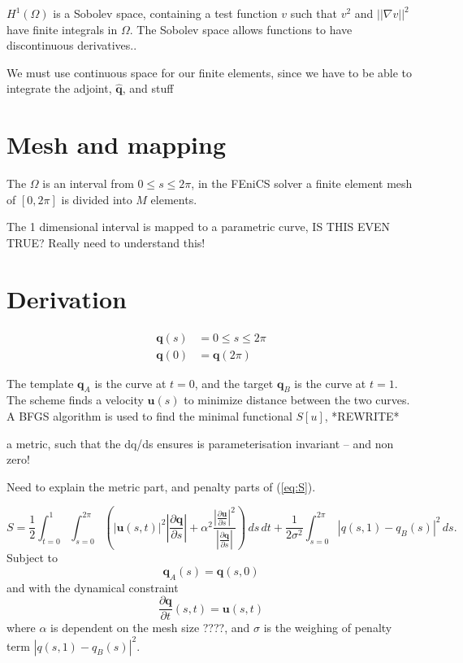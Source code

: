 \documentclass[a4paper, 10pt]{article}
\newcommand{\eq}[1]{(\ref{eq:#1})}
\newcommand{\vect}[1]{\ensuremath{\mathbf{#1}}}
\newcommand{\hvect}[1]{\ensuremath{\hat{\vect{#1}}}}
\begin{document}
$H^1(\Omega)$ is a Sobolev space, containing a test function $v$ such that $v^2$ and $||\nabla v||^2$ have finite integrals in $\Omega$. The Sobolev space allows functions to have discontinuous derivatives.. 


We must use continuous space for our finite elements, since we have to be able to integrate the adjoint, $\hvect q$, and stuff



\section{Mesh and mapping}
The $\Omega$ is an interval from $0 \leq s \leq 2\pi$, in the FEniCS solver a finite element mesh of $[0,2\pi]$ is divided into $M$ elements.

The 1 dimensional interval is mapped to a parametric curve, IS THIS EVEN TRUE? Really need to understand this!



\section{Derivation}
\begin{align*}
  \vect q(s) &= 0 \leq s \leq 2\pi \\
  \vect q(0) &= \vect q(2\pi)
\end{align*}


The template $\vect q_A$ is the curve at $t=0$, and the target $\vect q_B$
is the curve at $t=1$. The scheme finds a velocity $\vect u(s)$ to minimize
distance between the two curves. A BFGS algorithm is used to find the minimal
functional $S[u]$, *REWRITE*

a metric, such that the dq/ds ensures is parameterisation invariant -- and non zero!

Need to explain the metric part, and penalty parts of \eq{S}.

\begin{equation}
  \label{eq:S}
  S = \frac{1}{2} \int^{1}_{t=0} \int^{2\pi}_{s=0}\left( \left| \vect u(s,t) \right|^2 
  \left| \frac{\partial \vect q}{\partial s} \right|  + 
  \alpha^2 \frac{ 
    \left| \frac{\partial \vect u}{\partial s}\right|^2}{
    \left| \frac{\partial \vect q}{\partial s}\right|}\right)  \,ds\,dt
  + \frac{1}{2\sigma^2}\int^{2\pi}_{s=0}\left| q(s,1) - q_B(s)\right|^2\,ds.
\end{equation}
Subject to
\begin{equation}
  \vect q_A(s) =\vect q(s,0)   \label{eq:template}
\end{equation}
and with the dynamical constraint
\begin{equation}
  \frac{\partial \vect q}{\partial t}(s,t) = \vect u(s,t)  \label{eq:dqdt}
\end{equation}
where $\alpha$ is dependent on the mesh size ????, and $\sigma$ is the weighing
of penalty term $\left| q(s,1) - q_B(s)\right|^2$.
\end{document}
